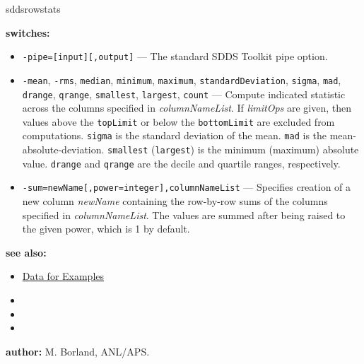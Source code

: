 \begin{sddsprog}{sddsrowstats}
  \item \textbf{switches:}
    \begin{itemize}
      \item \verb|-pipe=[input][,output]| --- The standard SDDS Toolkit pipe
        option.
      \item \verb|-mean|, \verb|-rms|, \verb|median|, \verb|minimum|,
        \verb|maximum|, \verb|standardDeviation|, \verb|sigma|, \verb|mad|,
        \verb|drange|, \verb|qrange|, \verb|smallest|, \verb|largest|,
        \verb|count| --- Compute indicated statistic across the columns
        specified in \emph{columnNameList}. If \emph{limitOps} are given, then
        values above the \verb|topLimit| or below the \verb|bottomLimit| are
        excluded from computations. \verb|sigma| is the standard deviation of
        the mean. \verb|mad| is the mean-absolute-deviation. \verb|smallest|
        (\verb|largest|) is the minimum (maximum) absolute value. \verb|drange|
        and \verb|qrange| are the decile and quartile ranges, respectively.
      \item \verb|-sum=newName[,power=integer],columnNameList| --- Specifies
        creation of a new column \emph{newName} containing the row-by-row sums
        of the columns specified in \emph{columnNameList}. The values are
        summed after being raised to the given power, which is 1 by default.
    \end{itemize}

  \item \textbf{see also:}
    \begin{itemize}
      \item \hyperref[exampleData]{Data for Examples}
      \item {}
      \item {}
      \item {}
    \end{itemize}

  \item \textbf{author:} M. Borland, ANL/APS.
\end{sddsprog}

